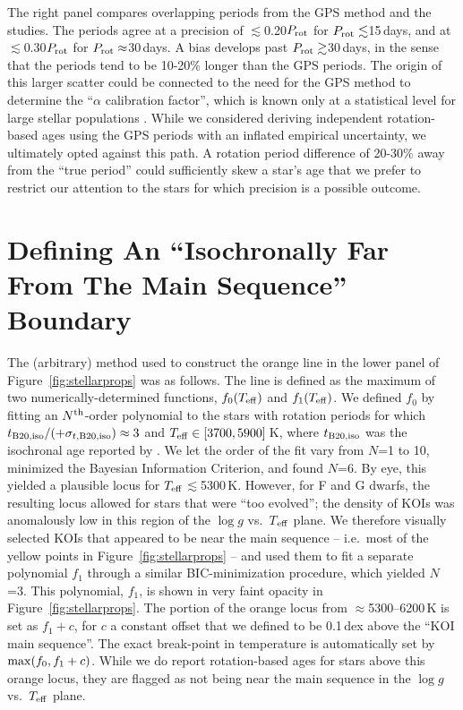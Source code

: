 \documentclass[11pt,twocolumn,tighten,linenumbers]{aastex63}
\begin{document}
The right panel compares overlapping periods from the
\citet{Reinhold2023} GPS method and the \citeauthor{Santos_2021} studies.  The
periods agree at a precision of $\lesssim$0.20$P_{\rm rot}$ for
$P_{\rm rot}\lesssim$15\,days, and at $\lesssim$0.30$P_{\rm rot}$ for
$P_{\rm rot}\approx$30\,days.  A  bias develops past $P_{\rm
rot}\gtrsim$30\,days, in the sense that the \citeauthor{Santos_2021}
periods tend to be 10-20\% longer than the GPS periods.  The origin of
this larger scatter could be connected to the need for the GPS method
to determine the ``$\alpha$ calibration factor'', which is known only
at a statistical level for large stellar populations
\citep[see][]{Reinhold2023}.  While we considered deriving independent
rotation-based ages using the \citet{Reinhold2023} GPS periods with an
inflated empirical uncertainty, we ultimately opted against this path.
A rotation period difference of 20-30\% away from the ``true period''
could sufficiently skew a star's age that we prefer to restrict our
attention to the stars for which precision is a possible
outcome.





\section{Defining An ``Isochronally Far From The Main Sequence'' Boundary}
\label{app:linemethod}

The (arbitrary) method used to construct the orange line in 
the lower panel of Figure~\ref{fig:stellarprops} was as follows.
The line is	defined as
the maximum of two numerically-determined functions, $f_0(T_{\rm eff})$ and $f_1(T_{\rm eff})$.
We defined $f_0$ by fitting an
$N^{\rm th}$-order polynomial to the stars with rotation periods for which $t_{\rm
	B20,iso}/(+\sigma_{t,{\rm B20,iso}})\approx 3$
and $T_{\rm eff}\in[3700,5900]$\,K, where
$t_{\rm B20,iso}$ was the isochronal age reported by
\citet{Berger_2020a_catalog}.  We let the order of the fit vary from
$N$=1 to 10, minimized the Bayesian Information Criterion,
and found $N$=6.  
By eye, this yielded a plausible locus for $T_{\rm eff}$$\lesssim$5300\,K.
However, for F and G dwarfs, the resulting locus
allowed for stars that were ``too evolved''; the density of KOIs 
was anomalously low in this region of the $\log g$ vs.\ $T$$_{\rm eff}$ plane.
We therefore visually selected KOIs that appeared
to be near the main sequence -- i.e.~most of the yellow
points in Figure~\ref{fig:stellarprops} -- and used them to fit a separate
polynomial $f_1$ through a similar BIC-minimization procedure,
which yielded $N$=3.
This polynomial, $f_1$, is shown in very faint opacity in Figure~\ref{fig:stellarprops}.
The portion of the orange locus from $\approx$5300--6200\,K
is set as $f_1 + c$, for $c$ a constant offset that we defined to be
0.1\,dex above the ``KOI main sequence''.
The exact break-point in temperature is automatically set by ${\rm max}(f_0, f_1+c)$.
While we do report rotation-based ages for stars
above this orange locus,
they are flagged as not being near the main sequence in the $\log g$ vs.~$T_{\rm eff}$ plane. 
\end{document}
